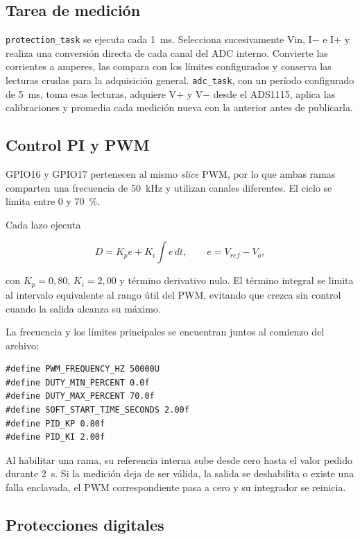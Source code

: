 \documentclass[conference]{IEEEtran}
\begin{document}
\subsection{Tarea de medición}

\texttt{protection\_task} se ejecuta cada 1~ms. Selecciona sucesivamente Vin, I$-$ e I$+$ y realiza una conversión directa de cada canal del ADC interno. Convierte las corrientes a amperes, las compara con los límites configurados y conserva las lecturas crudas para la adquisición general. \texttt{adc\_task}, con un período configurado de 5~ms, toma esas lecturas, adquiere V$+$ y V$-$ desde el ADS1115, aplica las calibraciones y promedia cada medición nueva con la anterior antes de publicarla.

\subsection{Control PI y PWM}

GPIO16 y GPIO17 pertenecen al mismo \textit{slice} PWM, por lo que ambas ramas comparten una frecuencia de 50~kHz y utilizan canales diferentes. El ciclo se limita entre 0 y 70~\%.

Cada lazo ejecuta

\begin{equation}
D=K_p e+K_i\int e\,dt, \qquad e=V_{ref}-V_o,
\end{equation}

con $K_p=0,80$, $K_i=2,00$ y término derivativo nulo. El término integral se limita al intervalo equivalente al rango útil del PWM, evitando que crezca sin control cuando la salida alcanza su máximo.

La frecuencia y los límites principales se encuentran juntos al comienzo del archivo:

\begin{lstlisting}[caption={Parámetros principales de PWM y control.}]
#define PWM_FREQUENCY_HZ 50000U
#define DUTY_MIN_PERCENT 0.0f
#define DUTY_MAX_PERCENT 70.0f
#define SOFT_START_TIME_SECONDS 2.00f
#define PID_KP 0.80f
#define PID_KI 2.00f
\end{lstlisting}

Al habilitar una rama, su referencia interna sube desde cero hasta el valor pedido durante 2~s. Si la medición deja de ser válida, la salida se deshabilita o existe una falla enclavada, el PWM correspondiente pasa a cero y su integrador se reinicia.

\subsection{Protecciones digitales}
\end{document}
